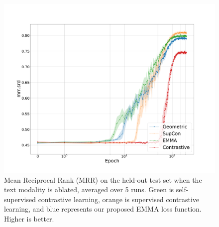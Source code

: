 \documentclass[10pt]{article} %
\begin{document}
\begin{figure}[tbh]
\centering
\includegraphics[width=.99\columnwidth]{Figures/average-seeds-epochs-mrr_ard.pdf}
\caption{Mean Reciprocal Rank (MRR) on the held-out test set when the text modality is ablated, averaged over 5 runs. Green is self-supervised contrastive learning, orange is supervised contrastive learning, and blue represents our proposed EMMA loss function. Higher is better.
}
\label{fig:epochs-mrr.srd}
\end{figure}

\end{document}

